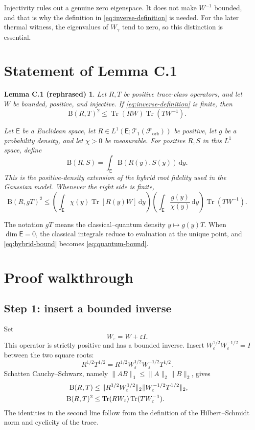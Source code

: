 \documentclass[11pt]{article}
\newcommand{\T}{\mathcal T_1}
\newcommand{\F}{\mathcal F_{\mathrm{orb}}}
\newcommand{\Tr}{\operatorname{Tr}}
\newcommand{\dd}{\,\mathrm d}
\newcommand{\B}{\mathrm B}
\newtheorem*{lemmaC}{Lemma C.1 (rephrased)}
\begin{document}
Injectivity rules out a genuine zero eigenspace.  It does not make $W^{-1}$
bounded, and that is why the definition in \eqref{eq:inverse-definition} is
needed.  For the later thermal witness, the eigenvalues of $W_\gamma$ tend to
zero, so this distinction is essential.

\section{Statement of Lemma C.1}

\begin{lemmaC}
Let $R,T$ be positive trace-class operators, and let $W$ be bounded,
positive, and injective.  If \eqref{eq:inverse-definition} is finite, then
\begin{equation}\label{eq:quantum-bound}
  \B(R,T)^2\leq\Tr(RW)\Tr(TW^{-1}).
\end{equation}

Let $\mathsf E$ be a Euclidean space, let
$R\in L^1(\mathsf E;\T(\F))$ be positive, let $g$ be a probability density,
and let $\chi>0$ be measurable.  For positive $R,S$ in this $L^1$ space,
define
\[
  \B(R,S)=\int_{\mathsf E}\B(R(y),S(y))\dd y.
\]
This is the positive-density extension of the hybrid root fidelity used in
the Gaussian model.  Whenever the right side is finite,
\begin{equation}\label{eq:hybrid-bound}
  \B(R,gT)^2
  \leq
  \left(\int_{\mathsf E}\chi(y)\Tr[R(y)W]\dd y\right)
  \left(\int_{\mathsf E}\frac{g(y)}{\chi(y)}\dd y\right)
  \Tr(TW^{-1}).
\end{equation}
\end{lemmaC}

The notation $gT$ means the classical--quantum density
$y\mapsto g(y)T$.  When $\dim\mathsf E=0$, the classical integrals reduce to
evaluation at the unique point, and \eqref{eq:hybrid-bound} becomes
\eqref{eq:quantum-bound}.

\section{Proof walkthrough}

\subsection*{Step 1: insert a bounded inverse}

Set
\[
  W_\varepsilon=W+\varepsilon I.
\]
This operator is strictly positive and has a bounded inverse.  Insert
$W_\varepsilon^{1/2}W_\varepsilon^{-1/2}=I$ between the two square roots:
\[
  R^{1/2}T^{1/2}
  =R^{1/2}W_\varepsilon^{1/2}
   W_\varepsilon^{-1/2}T^{1/2}.
\]
Schatten Cauchy--Schwarz, namely
$\|AB\|_1\leq\|A\|_2\|B\|_2$, gives
\begin{align}
  \B(R,T)
  &\leq
  \|R^{1/2}W_\varepsilon^{1/2}\|_2
  \|W_\varepsilon^{-1/2}T^{1/2}\|_2,\notag\\
  \B(R,T)^2
  &\leq
  \Tr(RW_\varepsilon)
  \Tr(TW_\varepsilon^{-1}).
  \label{eq:regularized-bound}
\end{align}
The identities in the second line follow from the definition of the
Hilbert--Schmidt norm and cyclicity of the trace.
\end{document}
